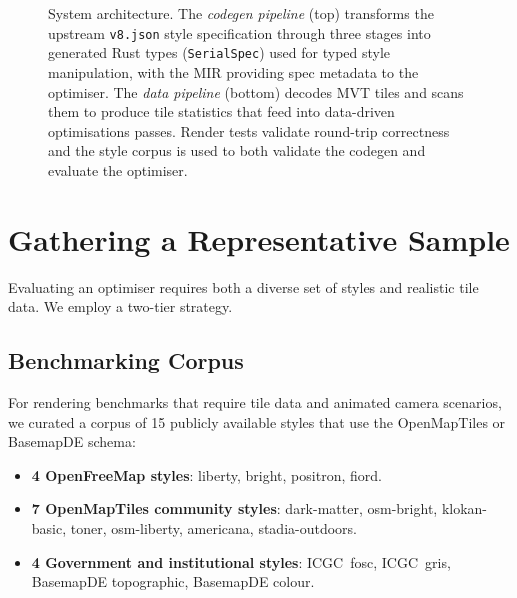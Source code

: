 \begin{figure}[htbp]
    \caption{System architecture.
    The \emph{codegen pipeline} (top) transforms the upstream \texttt{v8.json} style specification through three stages into generated Rust types (\texttt{SerialSpec}) used for typed style manipulation, with the MIR providing spec metadata to the optimiser.
    The \emph{data pipeline} (bottom) decodes \acs{MVT} tiles and scans them to produce tile statistics that feed into data-driven optimisations passes. Render tests validate round-trip correctness and the style corpus is used to both validate the codegen and evaluate the optimiser.}
    \label{fig:system_architecture}
\end{figure}

\section{Gathering a Representative Sample}\label{sec_gathering_sample}

Evaluating an optimiser requires both a diverse set of styles and realistic tile data.
We employ a two-tier strategy.

\subsection{Benchmarking Corpus}\label{sub_deep_corpus}

For rendering benchmarks that require tile data and animated camera scenarios, we curated a corpus of 15 publicly available styles that use the OpenMapTiles or BasemapDE schema:

\begin{itemize}
    \item \textbf{4 OpenFreeMap styles}: liberty, bright, positron, fiord.
    \item \textbf{7 OpenMapTiles community styles}: dark-matter, osm-bright, klokan-basic, toner, osm-liberty, americana, stadia-outdoors.
    \item \textbf{4 Government and institutional styles}: ICGC~fosc, ICGC~gris, Basemap\-DE topo\-graphic, Basemap\-DE colour.
\end{itemize}

